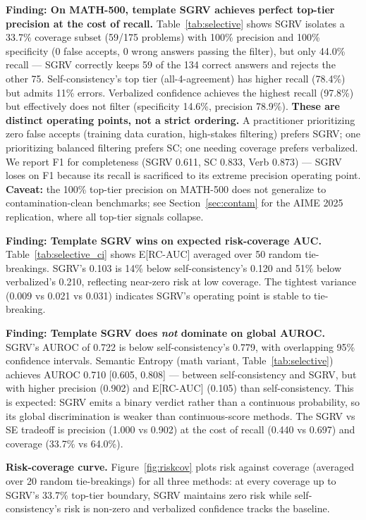 \documentclass{article}
\begin{document}
\textbf{Finding: On MATH-500, template SGRV achieves perfect top-tier precision at the cost of recall.} Table~\ref{tab:selective} shows SGRV isolates a 33.7\% coverage subset (59/175 problems) with 100\% precision and 100\% specificity (0 false accepts, 0 wrong answers passing the filter), but only 44.0\% recall --- SGRV correctly keeps 59 of the 134 correct answers and rejects the other 75. Self-consistency's top tier (all-4-agreement) has higher recall (78.4\%) but admits 11\% errors. Verbalized confidence achieves the highest recall (97.8\%) but effectively does not filter (specificity 14.6\%, precision 78.9\%). \textbf{These are distinct operating points, not a strict ordering.} A practitioner prioritizing zero false accepts (training data curation, high-stakes filtering) prefers SGRV; one prioritizing balanced filtering prefers SC; one needing coverage prefers verbalized. We report F1 for completeness (SGRV 0.611, SC 0.833, Verb 0.873) --- SGRV loses on F1 because its recall is sacrificed to its extreme precision operating point. \textbf{Caveat:} the 100\% top-tier precision on MATH-500 does not generalize to contamination-clean benchmarks; see Section~\ref{sec:contam} for the AIME 2025 replication, where all top-tier signals collapse.

\textbf{Finding: Template SGRV wins on expected risk-coverage AUC.} Table~\ref{tab:selective_ci} shows E[RC-AUC] averaged over 50 random tie-breakings. SGRV's 0.103 is 14\% below self-consistency's 0.120 and 51\% below verbalized's 0.210, reflecting near-zero risk at low coverage. The tightest variance (0.009 vs 0.021 vs 0.031) indicates SGRV's operating point is stable to tie-breaking.

\textbf{Finding: Template SGRV does \emph{not} dominate on global AUROC.} SGRV's AUROC of 0.722 is below self-consistency's 0.779, with overlapping 95\% confidence intervals. Semantic Entropy (math variant, Table~\ref{tab:selective}) achieves AUROC 0.710 [0.605, 0.808] --- between self-consistency and SGRV, but with higher precision (0.902) and E[RC-AUC] (0.105) than self-consistency. This is expected: SGRV emits a binary verdict rather than a continuous probability, so its global discrimination is weaker than continuous-score methods. The SGRV vs SE tradeoff is precision (1.000 vs 0.902) at the cost of recall (0.440 vs 0.697) and coverage (33.7\% vs 64.0\%).

\textbf{Risk-coverage curve.} Figure~\ref{fig:riskcov} plots risk against coverage (averaged over 20 random tie-breakings) for all three methods: at every coverage up to SGRV's 33.7\% top-tier boundary, SGRV maintains zero risk while self-consistency's risk is non-zero and verbalized confidence tracks the baseline.
\end{document}
